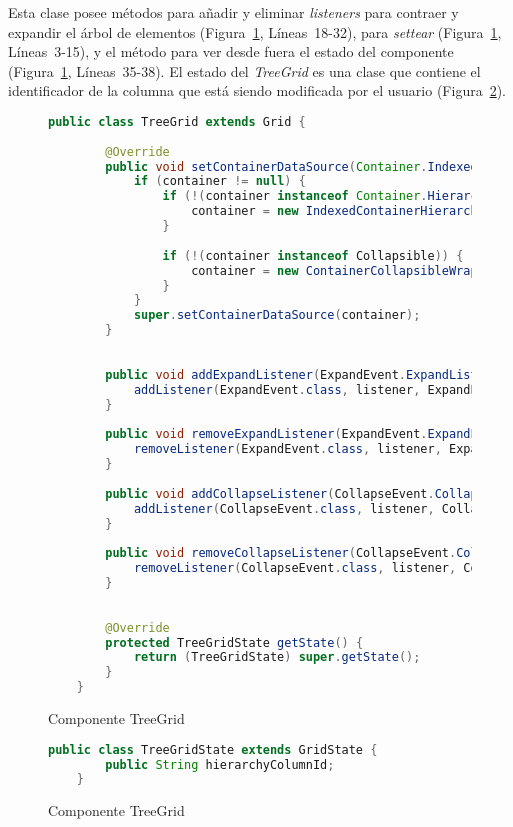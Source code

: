  Esta clase posee métodos para añadir y eliminar \emph{listeners} para contraer y expandir el árbol de elementos (Figura~\ref{fig:treeGrid}, Líneas~18-32), para \emph{settear} (Figura~\ref{fig:treeGrid}, Líneas~3-15), y el método para ver desde fuera el estado del componente (Figura~\ref{fig:treeGrid}, Líneas~35-38). El estado del \emph{TreeGrid} es una clase que contiene el identificador de la columna que está siendo modificada por el usuario (Figura~\ref{fig:treeGridState}).


\begin{figure}[!tb]
	\centering
	\begin{lstlisting}[language=Java]
	public class TreeGrid extends Grid {
		
		@Override
		public void setContainerDataSource(Container.Indexed container) {
			if (container != null) {
				if (!(container instanceof Container.Hierarchical)) {
					container = new IndexedContainerHierarchicalWrapper(container);
				}
				
				if (!(container instanceof Collapsible)) {
					container = new ContainerCollapsibleWrapper(container);
				}
			}
			super.setContainerDataSource(container);
		}
		
		
		public void addExpandListener(ExpandEvent.ExpandListener listener) {
			addListener(ExpandEvent.class, listener, ExpandEvent.ExpandListener.EXPAND_METHOD);
		}
		
		public void removeExpandListener(ExpandEvent.ExpandListener listener) {
			removeListener(ExpandEvent.class, listener, ExpandEvent.ExpandListener.EXPAND_METHOD);
		}
		
		public void addCollapseListener(CollapseEvent.CollapseListener listener) {
			addListener(CollapseEvent.class, listener, CollapseEvent.CollapseListener.COLLAPSE_METHOD);
		}
		
		public void removeCollapseListener(CollapseEvent.CollapseListener listener) {
			removeListener(CollapseEvent.class, listener, CollapseEvent.CollapseListener.COLLAPSE_METHOD);
		}
		
		
		@Override
		protected TreeGridState getState() {
			return (TreeGridState) super.getState();
		}
	}
	\end{lstlisting}
	\caption{Componente TreeGrid}
	\label{fig:treeGrid}
\end{figure}

\begin{figure}[!tb]
	\centering
	\begin{lstlisting}[language=Java]
	public class TreeGridState extends GridState {
		public String hierarchyColumnId;
	}
	\end{lstlisting}
	\caption{Componente TreeGrid}
	\label{fig:treeGridState}
\end{figure}


